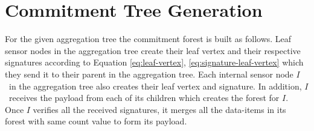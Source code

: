 
	\section{Commitment Tree Generation}
	For the given aggregation tree the commitment forest is built as follows.
	Leaf sensor nodes in the aggregation tree create their leaf vertex and their respective signatures according to Equation \ref{eq:leaf-vertex}, \ref{eq:signature-leaf-vertex} which they send it to their parent in the aggregation tree.
	Each internal sensor node $I$\ in the aggregation tree also creates their leaf vertex and signature.
	In addition, $I$\ receives the payload from each of its children which creates the forest for $I$.
	Once $I$ verifies all the received signatures, it merges all the data-items in its forest with same count value to form its payload.

